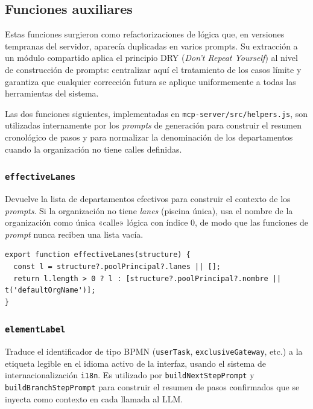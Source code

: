\subsection{Funciones auxiliares}
\label{subsec:helpers}

Estas funciones surgieron como refactorizaciones de lógica que, en versiones tempranas del servidor, aparecía duplicadas en varios prompts. Su extracción a un módulo compartido aplica el principio DRY (\textit{Don't Repeat Yourself}) al nivel de construcción de prompts: centralizar aquí el tratamiento de los casos límite y garantiza que cualquier corrección futura se aplique uniformemente a todas las herramientas del sistema. 

Las dos funciones siguientes, implementadas en \texttt{mcp-server/src/helpers.js}, son utilizadas internamente por los \textit{prompts} de generación para construir el resumen cronológico de pasos y para normalizar la denominación de los departamentos cuando la organización no tiene calles definidas.

\subsubsection{\texttt{effectiveLanes}}

Devuelve la lista de departamentos efectivos para construir el contexto de los \textit{prompts}. Si la organización no tiene \textit{lanes} (piscina única), usa el nombre de la organización como única «calle» lógica con índice 0, de modo que las funciones de \textit{prompt} nunca reciben una lista vacía.

\begin{lstlisting}[style=promptbox]
export function effectiveLanes(structure) {
  const l = structure?.poolPrincipal?.lanes || [];
  return l.length > 0 ? l : [structure?.poolPrincipal?.nombre || t('defaultOrgName')];
}
\end{lstlisting}

\subsubsection{\texttt{elementLabel}}

Traduce el identificador de tipo BPMN (\texttt{userTask}, \texttt{exclusiveGateway}, etc.) a la etiqueta legible en el idioma activo de la interfaz, usando el sistema de internacionalización \texttt{i18n}. Es utilizado por \texttt{buildNextStepPrompt} y \texttt{buildBranchStepPrompt} para construir el resumen de pasos confirmados que se inyecta como contexto en cada llamada al LLM.

